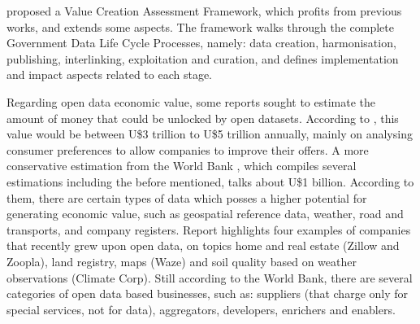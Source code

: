  proposed a Value Creation Assessment Framework, which profits from previous works, and extends some aspects.
The framework walks through the complete Government Data Life Cycle Processes, namely: data creation, harmonisation, publishing, interlinking, exploitation and curation, and defines implementation and impact aspects related to each stage.

Regarding open data economic value, some reports sought to estimate the amount of money that could be unlocked by open datasets.
According to , this value would be between U\$3 trillion to U\$5 trillion  annually, mainly on analysing consumer preferences to allow companies to improve their offers.
A more conservative estimation from the World Bank \cite{TheWorldBank2014}, which compiles several estimations including the before mentioned, talks about U\$1  billion.
According to them, there are certain types of data which posses a higher potential for generating economic value, such as geospatial reference data, weather, road and transports, and company registers.
Report highlights four examples of companies that recently grew upon open data, on topics home and real estate (Zillow and Zoopla), land registry, maps (Waze) and soil quality based on weather observations (Climate Corp).
Still according to the World Bank, there are several categories of open data based businesses, such as: suppliers (that charge only for special services, not for data), aggregators,  developers, enrichers and enablers.




